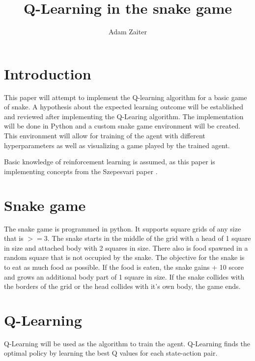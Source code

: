 \documentclass[lettersize,journal]{IEEEtran}
\begin{document}
\title{Q-Learning in the snake game}
\author{Adam Zaiter}

\maketitle

\begin{abstract}
\end{abstract}



\section{Introduction}
This paper will attempt to implement the Q-learning algorithm
for a basic game of snake. A hypothesis about the expected learning
outcome will be established and reviewed after implementing the
Q-Learing algorithm. The implementation will be done in Python
and a custom snake game environment will be created.
This environment will allow for training of the agent with different
hyperparameters as well as visualizing a game played by the
trained agent.


Basic knowledge of reinforcement learning is assumed, as this paper
is implementing concepts from the Szepesvari paper \cite{szepesvari}.

\section{Snake game}
The snake game is programmed in python.
It supports square grids of any size that is $>= 3$.
The snake starts in the middle of the grid with a head of
1 square in size and attached
body with 2 squares in size. There also is food spawned in a random
square that is not occupied by the snake. The objective for the
snake is to eat as much food as possible. If the food is eaten,
the snake gains + 10 score and grows an additional body part of
1 square in size. If the snake collides with the borders of the grid
or the head collides with it's own body, the game ends.\label{game-over}


\section{Q-Learning}
Q-Learning will be used as the algorithm to train the agent.
Q-Learning finds the optimal policy by learning
the best Q values for each state-action pair.
\end{document}
